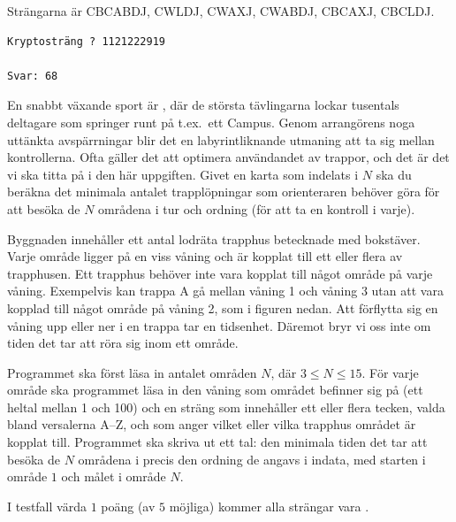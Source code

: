  Strängarna är CBCABDJ, CWLDJ, CWAXJ, CWABDJ, CBCAXJ, CBCLDJ.

\vspace{1cm}

\begin{verbatim}
Kryptosträng ? 1121222919

Svar: 68
\end{verbatim}


\newpage
{}

En snabbt växande sport är , där de största tävlingarna lockar tusentals deltagare som springer runt på t.ex.\ ett Campus. Genom arrangörens noga uttänkta avspärrningar blir det en labyrintliknande utmaning att ta sig mellan kontrollerna. Ofta gäller det att optimera användandet av trappor, och det är det vi ska titta på i den här uppgiften. Givet en karta som indelats i $N$  ska du beräkna det minimala antalet trapplöpningar som orienteraren behöver göra för att besöka de $N$ områdena i tur och ordning (för att ta en kontroll i varje).

Byggnaden innehåller ett antal lodräta trapphus betecknade med bokstäver. Varje område ligger på en viss våning och är kopplat till ett eller flera av trapphusen. Ett trapphus behöver inte vara kopplat till något område på varje våning. Exempelvis kan trappa A gå mellan våning 1 och våning 3 utan att vara kopplad till något område på våning 2, som i figuren nedan. Att förflytta sig en våning upp eller ner i en trappa tar en tidsenhet. Däremot bryr vi oss inte om tiden det tar att röra sig inom ett område.

Programmet ska först läsa in antalet områden $N$, där $3\le N \le 15$. För varje område ska programmet läsa in den våning som området befinner sig på (ett heltal mellan 1 och 100) och en sträng som innehåller ett eller flera tecken, valda bland versalerna A--Z, och som anger vilket eller vilka trapphus området är kopplat till. Programmet ska skriva ut ett tal: den minimala tiden det tar att besöka de $N$ områdena i precis den ordning de angavs i indata, med starten i område $1$ och målet i område $N$. 

 I testfall värda $1$ poäng (av $5$ möjliga) kommer alla strängar vara .\\

